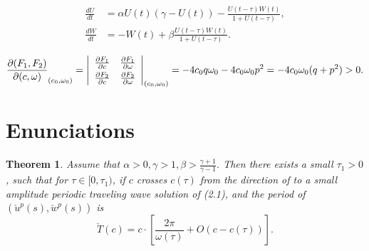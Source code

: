 \documentclass[preprint]{ptephy_v1}%
\newtheorem{theorem}{Theorem}
\begin{document}
\begin{equation}\label{1.2}
\begin{split}
\frac{dU}{dt} &=\alpha U(t)(\gamma -U(t))-\frac{U(t-\tau)W(t)}{1+U(t-\tau)},\\
\frac{dW}{dt} &=-W(t)+\beta\frac{U(t-\tau)W(t)}{1+U(t-\tau)}.
\end{split}
\end{equation}

\[
\frac{\partial(F_1,F_2)}{\partial(c,\omega)}_{(c_0,\omega_0)} = \left|
\begin{array}{ll}
\frac{\partial F_1}{\partial c} &\frac{\partial F_1}{\partial \omega} \\\noalign{\vskip3pt}
\frac{\partial F_2}{\partial c}&\frac{\partial F_2}{\partial \omega}
\end{array}\right|_{(c_0,\omega_0)}=-4c_0q\omega_0 -4c_0\omega_0p^2 =-4c_0\omega_0(q+p^2)>0.
\]

\section{Enunciations}





\begin{theorem}\label{T0.1}
Assume that $\alpha>0, \gamma>1, \beta>\frac{\gamma+1}{\gamma-1}$.
Then there exists a small $\tau_1>0$, such that for $\tau\in
[0,\tau_1)$, if $c$ crosses $c(\tau)$ from the direction of
to  a small amplitude periodic traveling wave solution of
(2.1), and the period of $(\check{u}^p(s),\check{w}^p(s))$ is
\[
\check{T}(c)=c\cdot \left[\frac{2\pi}{\omega(\tau)}+O(c-c(\tau))\right].
\]
\end{theorem}
\end{document}
